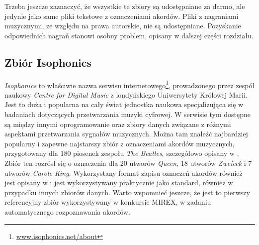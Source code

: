 \begin{table}
    \centering
    \caption{Fragment indeksu zbioru danych po pierwszym etapie jego tworzenia.}
    \label{tab:indeks_01}
\end{table}

Trzeba jeszcze zaznaczyć, że wszystkie te zbiory są udostępniane za darmo, ale jedynie jako same
pliki tekstowe z oznaczeniami akordów. Pliki z nagraniami muzycznymi, ze względu na prawa autorskie,
nie są udostępniane. Pozyskanie odpowiednich nagrań stanowi osobny problem, opisany w dalszej części
rozdziału.

\subsection{Zbiór Isophonics}

\emph{Isophonics} to właściwie nazwa serwisu internetowego\footnote{\url{www.isophonics.net/about}},
prowadzonego przez zespół naukowy \emph{Centre for Digital Music} z londyńskiego Uniwersytety
Królowej Marii. Jest to duża i popularna na cały świat jednostka naukowa specjalizująca się w
badaniach dotyczących przetwarzania muzyki cyfrowej. W serwisie tym dostępne są między innymi
oprogramowanie oraz zbiory danych związane z różnymi aspektami przetwarzania sygnałów muzycznych.
Można tam znaleźć najbardziej popularny i zapewne najstarszy zbiór z oznaczeniami akordów
muzycznych, przygotowany dla 180 piosenek zespołu \emph{The Beatles}, szczegółowo opisany w
\cite{harte_towards_nodate}. Zbiór ten rozrósł się o oznaczenia dla 20 utworów \emph{Queen}, 18
utworów \emph{Zweieck} i 7 utworów \emph{Carole King}. Wykorzystany format zapisu oznaczeń akordów
również jest opisany w \cite{harte_towards_nodate} i jest wykorzystywany praktycznie jako standard,
również w przypadku innych zbiorów danych. Warto wspomnieć jeszcze, że jest to pierwszy referencyjny
zbiór wykorzystywany w konkursie MIREX, w zadaniu automatycznego rozpoznawania akordów.

